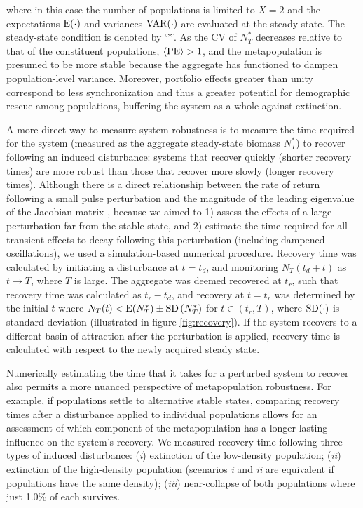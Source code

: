 \documentclass{revtex4}
\begin{document}
\noindent where in this case the number of populations is limited to $X=2$ and the expectations $\rm E(\cdot)$ and variances $\rm VAR(\cdot)$ are evaluated at the steady-state.
The steady-state condition is denoted by `$*$'.
As the CV of $N_T^*$ decreases relative to that of the constituent populations, $\langle{\rm PE}\rangle > 1$, and the metapopulation is presumed to be more stable because the aggregate has functioned to dampen population-level variance.
Moreover, portfolio effects greater than unity correspond to less synchronization  \citep{Loreau:2008ju,Anderson:2014cx,Yeakel:2013vz} and thus a greater potential for demographic rescue among populations, buffering the system as a whole against extinction. 

A more direct way to measure system robustness is to measure the time required for the system (measured as the aggregate steady-state biomass $N_T^*$) to recover following an induced disturbance: systems that recover quickly (shorter recovery times) are more robust than those that recover more slowly (longer recovery times).
Although there is a direct relationship between the rate of return following a small pulse perturbation and the magnitude of the leading eigenvalue of the Jacobian matrix \citep{GuckHolmes}, because we aimed to 
1) assess the effects of a large perturbation far from the stable state, and 
2) estimate the time required for all transient effects to decay following this perturbation (including dampened oscillations), we used a simulation-based numerical procedure.
Recovery time was calculated by initiating a disturbance at $t=t_d$, and monitoring $N_T(t_d+t)$ as $t\rightarrow T$, where $T$ is large. 
The aggregate was deemed recovered at $t_r$, such that recovery time was calculated as $t_r-t_d$, and recovery at $t=t_r$ was determined by the initial $t$ where $N_T(t) < {\rm E}(N_T^*)\pm{\rm SD}\left( N_T^* \right)$ for $t\in(t_r,T)$, where $\rm{SD}(\cdot)$ is standard deviation (illustrated in figure \ref{fig:recovery}).
If the system recovers to a different basin of attraction after the perturbation is applied, recovery time is calculated with respect to the newly acquired steady state.

Numerically estimating the time that it takes for a perturbed system to recover also permits a more nuanced perspective of metapopulation robustness.
For example, if populations settle to alternative stable states, comparing recovery times after a disturbance applied to individual populations allows for an assessment of which component of the metapopulation has a longer-lasting influence on the system's recovery.
We measured recovery time following three types of induced disturbance: (\emph{i}) extinction of the low-density population; (\emph{ii}) extinction of the high-density population (scenarios \emph{i} and \emph{ii} are equivalent if populations have the same density); (\emph{iii}) near-collapse of both populations where just 1.0\% of each survives.
\\
\end{document}
